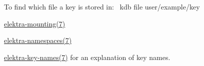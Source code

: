 To find which file a key is stored in\+:~\newline
 {\ttfamily kdb file user/example/key}~\newline



\begin{DoxyItemize}
\item \hyperlink{doc_help_elektra-mounting_md}{elektra-\/mounting(7)}
\item \hyperlink{doc_help_elektra-namespaces_md}{elektra-\/namespaces(7)}
\item \hyperlink{doc_help_elektra-key-names_md}{elektra-\/key-\/names(7)} for an explanation of key names. 
\end{DoxyItemize}